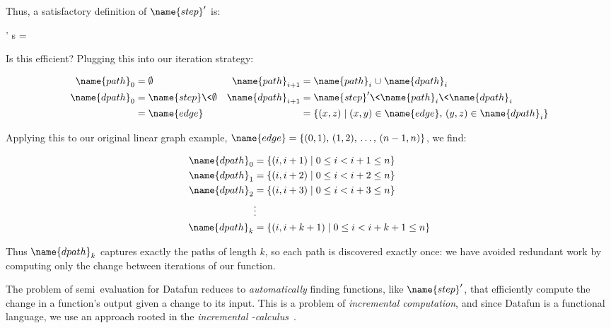 \noindent
Thus, a satisfactory definition of $\name{step}'$ is:

\begin{code}
' \<s \<\ds = 
\end{code}

\noindent
Is this efficient? Plugging this into our iteration strategy:


\begin{align*}
  \name{path}_0 &= \emptyset
  &
  \name{path}_{i+1} &= \name{path}_i \cup \name{dpath}_i\\
  \name{dpath}_0 &= \name{step}\<\emptyset
  &
  \name{dpath}_{i+1} &= \name{step}' \<\name{path}_i \<\name{dpath}_i
  \\
  &= \name{edge}
  &&= \setfor{(x,z)}{(x,y) \in \name{edge},\, (y,z) \in \name{dpath}_i}
\end{align*}

\noindent
Applying this to our original linear graph example, $\name{edge} = \{(0,1),\, (1,2),\, \dots,\, ({n-1},n)\}$, we find:

\begin{align*}
  \name{dpath}_0 &= \setfor{(i,i+1)}{0 \le i < i+1 \le n}\\
  \name{dpath}_1 &= \setfor{(i,i+2)}{0 \le i < i+2 \le n}\\
  \name{dpath}_2 &= \setfor{(i,i+3)}{0 \le i < i+3 \le n}\\
  &\vdots\\
  \name{dpath}_k &= \setfor{(i,i+k+1)}{0 \le i < i+k+1 \le n}
\end{align*}

\noindent
Thus $\name{dpath}_k$ captures exactly the paths of length $k$, so each path is discovered exactly once: we have avoided redundant work by computing only the change between iterations of our  function.

The problem of semi\naive\ evaluation for Datafun reduces to \emph{automatically} finding functions, like $\name{step}'$, that efficiently compute the change in a function's output given a change to its input.
%
This is a problem of \emph{incremental computation}, and since Datafun is a
functional language, we use an approach rooted in the \emph{incremental
  \fn-calculus}~\citep{incremental,DBLP:conf/esop/GiarrussoRS19,DBLP:phd/dnb/Giarrusso20}.

